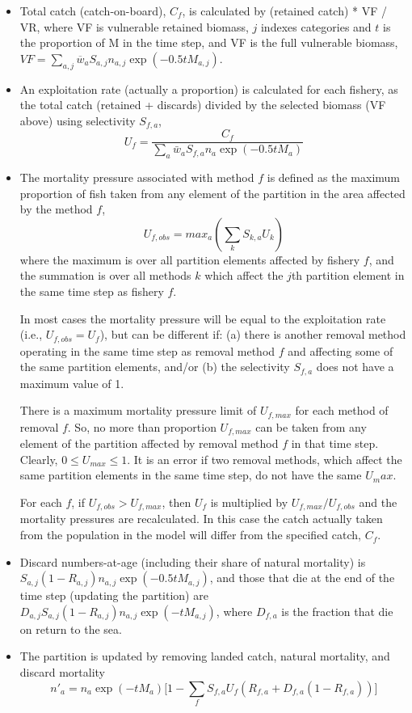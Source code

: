 \begin{itemize}
    \item Total catch (catch-on-board), $C_{f}$, is calculated by (retained catch) * VF / VR, where VF is vulnerable retained biomass, $j$ indexes categories and $t$ is the proportion of M in the time step, and VF is the full vulnerable biomass, $VF = \sum_{a,j} \overline{w}_{a} S_{a,j} n_{a,j} \exp(-0.5 t M_{a,j})$.

    \item An exploitation rate (actually a proportion) is calculated for each fishery, as the total catch (retained + discards) divided by the selected biomass (VF above) using selectivity $S_{f,a}$,
        $$ U_f = \frac{C_f}{\sum_a \bar{w}_a S_{f,a} n_a \exp(-0.5 t M_{a})}$$

    \item The mortality pressure associated with method $f$ is defined as the maximum proportion of fish taken from any element of the partition in the area affected by the method $f$,
        $$ U_{f,obs} = max_a (\sum_k S_{k,a} U_k) $$
    where the maximum is over all partition elements affected by fishery $f$, and the summation is over all methods $k$ which affect the $j$th partition element in the same time step as fishery $f$.

    In most cases the mortality pressure will be equal to the exploitation rate (i.e., $U_{f,obs} = U_f$), but can be different if: (a) there is another removal method operating in the same time step as removal method $f$ and affecting some of the same partition elements, and/or (b) the selectivity $S_{f,a}$ does not have a maximum value of 1.

    There is a maximum mortality pressure limit of $U_{f,max}$ for each method of removal $f$. So, no more than proportion $U_{f,max}$ can be taken from any element of the partition affected by removal method $f$ in that time step. Clearly, $0 \leq U_{max} \leq 1$. It is an error if two removal methods, which affect the same partition elements in the same time step, do not have the same $U_max$.

    For each $f$, if $U_{f,obs} > U_{f,max}$, then $U_f$ is multiplied by $U_{f,max}/U_{f,obs}$ and the mortality pressures are recalculated. In this case the catch actually taken from the population in the model will differ from the specified catch, $C_f$.

    \item Discard numbers-at-age (including their share of natural mortality) is $S_{a,j} (1 - R_{a,j}) n_{a,j} \exp(-0.5 t M_{a,j})$, and those that die at the end of the time step (updating the partition) are $D_{a,j} S_{a,j} (1 - R_{a,j}) n_{a,j} \exp(-t M_{a,j})$, where $D_{f,a}$ is the fraction that die on return to the sea.

    \item The partition is updated by removing landed catch, natural mortality, and discard mortality
        $$ n'_{a} = n_{a} \exp(-t M_a) \big[ 1 - \sum_f S_{f,a} U_f (R_{f,a} + D_{f,a} (1 - R_{f,a})) \big] $$
\end{itemize}


